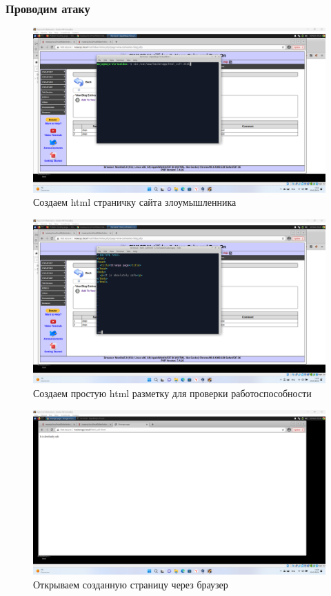 \documentclass[a4paper]{article}
\begin{document}
  \subsubsection{Проводим атаку}

  \begin{figure}[H]
    \centering
    \includegraphics[width=\textwidth]{Screenshot_34}
    \caption{Создаем html страничку сайта злоумышленника}
  \end{figure}

  \begin{figure}[H]
    \centering
    \includegraphics[width=\textwidth]{Screenshot_35}
    \caption{Создаем простую html разметку для проверки работоспособности}
  \end{figure}

  \begin{figure}[H]
    \centering
    \includegraphics[width=\textwidth]{Screenshot_36}
    \caption{Открываем созданную страницу через браузер}
  \end{figure}
\end{document}
